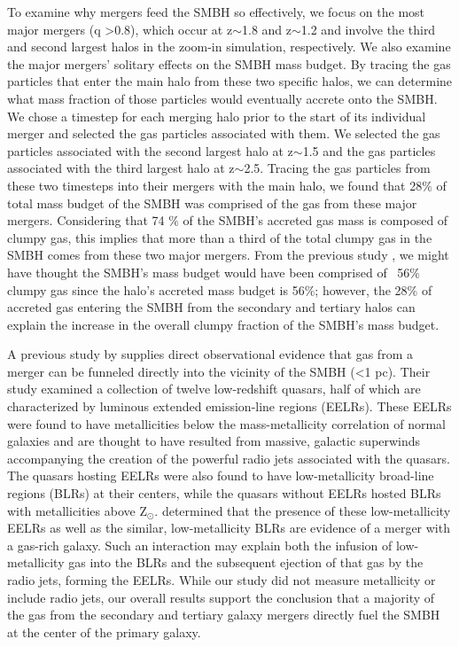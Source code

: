 \documentclass[]{emulateapj}
\begin{document}
To examine why mergers feed the SMBH so effectively, we focus on the most major mergers (q \textgreater 0.8), which occur at  z$\sim$1.8 and z$\sim$1.2 and involve the third and second largest halos in the zoom-in simulation, respectively. We also examine the major mergers' solitary effects on the SMBH mass budget. By tracing the gas particles that enter the main halo from these two specific halos, we can determine what mass fraction of those particles would eventually accrete onto the SMBH. We chose a timestep for each merging halo prior to the start of its individual merger and selected the gas particles associated with them. We selected the gas particles associated with the second largest halo at z$\sim$1.5 and the gas particles associated with the third largest halo at z$\sim$2.5. Tracing the gas particles from these two timesteps into their mergers with the main halo, we found that 28$\%$ of total mass budget of the SMBH was comprised of the gas from these major mergers. Considering that 74 $\%$ of the SMBH's accreted gas mass is composed of clumpy gas, this implies that more than a third of the total clumpy gas in the SMBH comes from these two major mergers. From the previous study \citep{Bellovary2013}, we might have thought the SMBH's mass budget would have been comprised of ~56$\%$ clumpy gas since the halo's accreted mass budget is 56$\%$; however, the 28$\%$ of accreted gas entering the SMBH from the secondary and tertiary halos can explain the increase in the overall clumpy fraction of the SMBH's mass budget.

A previous study by \cite{Fu2007} supplies direct observational evidence that gas from a merger can be funneled directly into the vicinity of the SMBH (\textless 1 pc). Their study examined a collection of twelve low-redshift quasars, half of which are characterized by luminous extended emission-line regions (EELRs). These EELRs were found to have metallicities below the mass-metallicity correlation of normal galaxies and are thought to have resulted from massive, galactic superwinds accompanying the creation of the powerful radio jets associated with the quasars. The quasars hosting EELRs were also found to have low-metallicity broad-line regions (BLRs) at their centers, while the quasars without EELRs hosted BLRs with metallicities above Z$_{\odot}$. \cite{Fu2007} determined that the presence of these low-metallicity EELRs as well as the similar, low-metallicity BLRs are evidence of a merger with a gas-rich galaxy. Such an interaction may explain both the infusion of low-metallicity gas into the BLRs and the subsequent ejection of that gas by the radio jets, forming the EELRs.  While our study did not measure metallicity or include radio jets, our overall results support the conclusion that a majority of the gas from the secondary and tertiary galaxy mergers directly fuel the SMBH at the center of the primary galaxy. 
\end{document}
